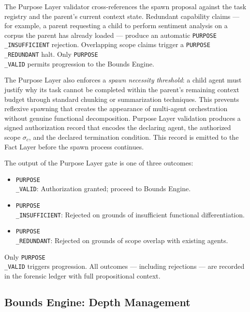 The Purpose Layer validator cross-references the spawn proposal against the task registry and the parent's current context state. Redundant capability claims — for example, a parent requesting a child to perform sentiment analysis on a corpus the parent has already loaded — produce an automatic \texttt{PURPOSE\\_INSUFFICIENT} rejection. Overlapping scope claims trigger a \texttt{PURPOSE\\_REDUNDANT} halt. Only \texttt{PURPOSE\\_VALID} permits progression to the Bounds Engine.

The Purpose Layer also enforces a \textit{spawn necessity threshold}: a child agent must justify why its task cannot be completed within the parent's remaining context budget through standard chunking or summarization techniques. This prevents reflexive spawning that creates the appearance of multi-agent orchestration without genuine functional decomposition. Purpose Layer validation produces a signed authorization record that encodes the declaring agent, the authorized scope $\sigma_c$, and the declared termination condition. This record is emitted to the Fact Layer before the spawn process continues.

The output of the Purpose Layer gate is one of three outcomes:

\begin{itemize}
    \itemsep0em
    \item \texttt{PURPOSE\\_VALID}: Authorization granted; proceed to Bounds Engine.
    \item \texttt{PURPOSE\\_INSUFFICIENT}: Rejected on grounds of insufficient functional differentiation.
    \item \texttt{PURPOSE\\_REDUNDANT}: Rejected on grounds of scope overlap with existing agents.
\end{itemize}

Only \texttt{PURPOSE\\_VALID} triggers progression. All outcomes — including rejections — are recorded in the forensic ledger with full propositional context.

\subsection{Bounds Engine: Depth Management}
\label{sec:bounds-engine}

